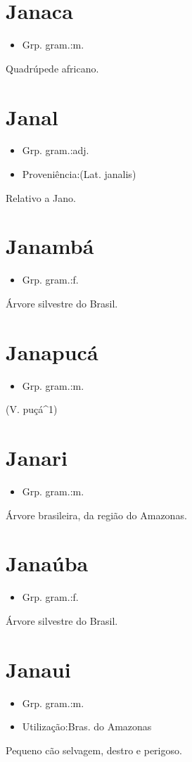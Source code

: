 \documentclass{article}
\begin{document}
\section{Janaca}
\begin{itemize}
\item {Grp. gram.:m.}
\end{itemize}
Quadrúpede africano.
\section{Janal}
\begin{itemize}
\item {Grp. gram.:adj.}
\end{itemize}
\begin{itemize}
\item {Proveniência:(Lat. \textunderscore janalis\textunderscore )}
\end{itemize}
Relativo a Jano.
\section{Janambá}
\begin{itemize}
\item {Grp. gram.:f.}
\end{itemize}
Árvore silvestre do Brasil.
\section{Janapucá}
\begin{itemize}
\item {Grp. gram.:m.}
\end{itemize}
(V. \textunderscore puçá\textunderscore ^1)
\section{Janari}
\begin{itemize}
\item {Grp. gram.:m.}
\end{itemize}
Árvore brasileira, da região do Amazonas.
\section{Janaúba}
\begin{itemize}
\item {Grp. gram.:f.}
\end{itemize}
Árvore silvestre do Brasil.
\section{Janaui}
\begin{itemize}
\item {Grp. gram.:m.}
\end{itemize}
\begin{itemize}
\item {Utilização:Bras. do Amazonas}
\end{itemize}
Pequeno cão selvagem, destro e perigoso.
\end{document}
